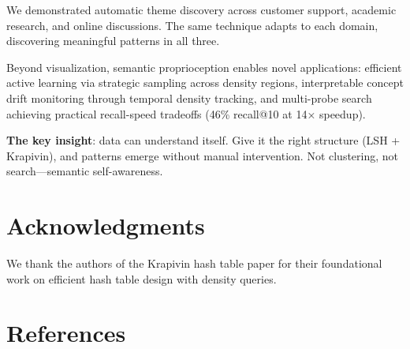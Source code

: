 \documentclass[
]{article}
\begin{document}
We demonstrated automatic theme discovery across customer support,
academic research, and online discussions. The same technique adapts to
each domain, discovering meaningful patterns in all three.

Beyond visualization, semantic proprioception enables novel
applications: efficient active learning via strategic sampling across
density regions, interpretable concept drift monitoring through temporal
density tracking, and multi-probe search achieving practical
recall-speed tradeoffs (46\% recall@10 at 14× speedup).

\textbf{The key insight}: data can understand itself. Give it the right
structure (LSH + Krapivin), and patterns emerge without manual
intervention. Not clustering, not search---semantic self-awareness.

\section{Acknowledgments}\label{acknowledgments}

We thank the authors of the Krapivin hash table paper for their
foundational work on efficient hash table design with density queries.

\section{References}\label{references}

\printbibliography[heading=none]
\end{document}
